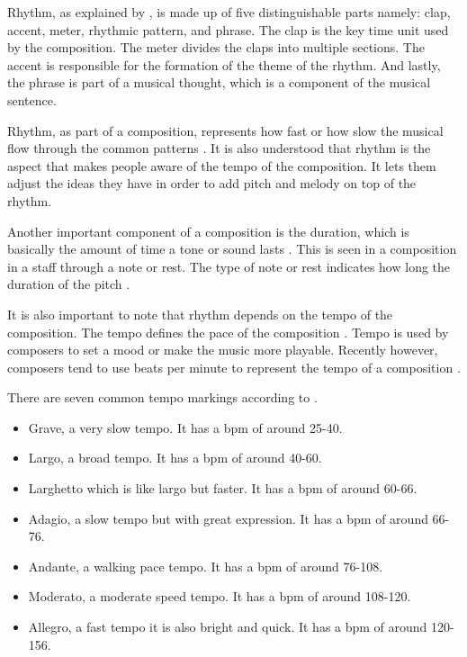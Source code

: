Rhythm, as explained by , is made up of five distinguishable parts namely: clap, accent, meter, rhythmic pattern, and phrase. The clap is the key time unit used by the composition. The meter divides the claps into multiple sections. The accent is responsible for the formation of the theme of the rhythm. And lastly, the phrase is part of a musical thought, which is a component of the musical sentence.

Rhythm, as part of a composition, represents how fast or how slow the musical flow through the common patterns \cite{rivadelo1986fundamentals}. It is also understood that rhythm is the aspect that makes people aware of the tempo of the composition. It lets them adjust the ideas they have in order to add pitch and melody on top of the rhythm.

Another important component of a composition is the duration, which is basically the amount of time a tone or sound lasts \cite{rivadelo1986fundamentals}. This is seen in a composition in a staff through a note or rest. The type of note or rest indicates how long the duration of the pitch \cite{rivadelo1986fundamentals}. 

It is also important to note that rhythm depends on the tempo of the composition. The tempo defines the pace of the composition \cite{rivadelo1986fundamentals, nelson2009foundations}. Tempo is used by composers to set a mood or make the music more playable. Recently however, composers tend to use beats per minute to represent the tempo of a composition \cite{nelson2009foundations}.

There are seven common tempo markings according to \citeauthor{nelson2009foundations}. 
\begin{itemize}
    \item Grave, a very slow tempo. It has a bpm of around 25-40.
    \item Largo, a broad tempo. It has a bpm of around 40-60.
    \item Larghetto which is like largo but faster. It has a bpm of around 60-66.
    \item Adagio, a slow tempo but with great expression. It has a bpm of around 66-76.
    \item Andante, a walking pace tempo. It has a bpm of around 76-108.
    \item Moderato, a moderate speed tempo. It has a bpm of around 108-120.
    \item Allegro, a fast tempo it is also bright and quick. It has a bpm of around 120-156. 
\end{itemize}

